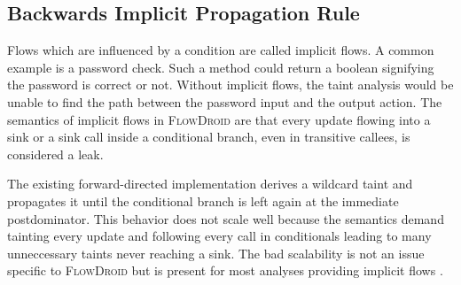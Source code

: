 \documentclass[../draft.tex]{subfiles}
\begin{document}
    \subsection{Backwards Implicit Propagation Rule}
    Flows which are influenced by a condition are called implicit flows.
    A common example is a password check.
    Such a method could return a boolean signifying the password is correct or not.
    Without implicit flows, the taint analysis would be unable to find the path between the password input and the output action.
    The semantics of implicit flows in \textsc{FlowDroid} are that every update flowing into a sink or a sink call inside a conditional branch, even in transitive callees, is considered a leak.

    The existing forward-directed implementation derives a wildcard taint\footnotemark{} and propagates it until the conditional branch is left again at the immediate postdominator.
    This behavior does not scale well because the semantics demand tainting every update and following every call in conditionals leading to many unneccessary taints never reaching a sink.
    The bad scalability is not an issue specific to \textsc{FlowDroid} but is present for most analyses providing implicit flows \cite{King2008}.
\end{document}
